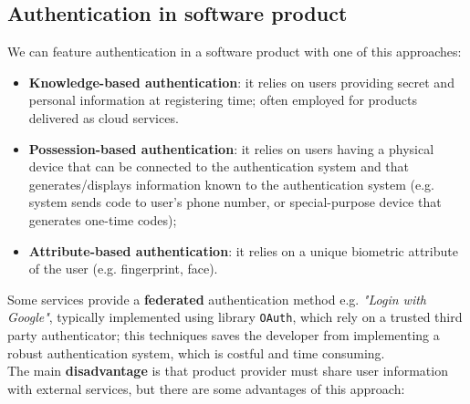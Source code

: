 \subsection{Authentication in software product}
We can feature authentication in a software product with one of this approaches:
\begin{itemize}
   \item \textbf{Knowledge-based authentication}: it relies on users providing secret and personal information at registering time;  often employed for products delivered as
   cloud services.
   \item \textbf{Possession-based authentication}: it relies on users having a physical device that can be connected to the authentication system and that generates/displays information known to the authentication system (e.g. system sends code to user’s phone number, or special-purpose device that generates one-time codes);
   \item \textbf{Attribute-based authentication}: it relies on a unique biometric attribute of the user (e.g. fingerprint, face).
\end{itemize}


Some services provide a \textbf{federated} authentication method e.g. \textit{"Login with Google"}, typically implemented using library \texttt{OAuth},
which rely on a trusted third party authenticator;
this techniques saves the developer from implementing a robust authentication system, which is costful and time consuming.\\
The main \textbf{disadvantage} is that product provider must share user information with external services, but there are some advantages of this approach:

